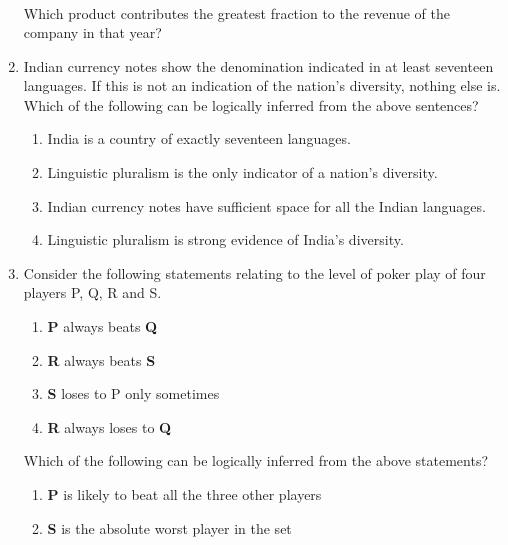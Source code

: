 \documentclass[journal,12pt,onecolumn]{IEEEtran}
\theoremstyle{remark}
\begin{document}
\begin{enumerate}
\begin{table}[h]
\begin{tabular}{|l|c|c|c|c|}
				\hline
			\end{tabular}
			\caption*{}
			\label{tab:razorsales}
		\end{table}
		
		Which product contributes the greatest fraction to the revenue of the company in that year?
		
		\hfill{}
		\begin{enumerate}
		\end{enumerate}
		
		\item Indian currency notes show the denomination indicated in at least seventeen languages. If this is not an indication of the nation's diversity, nothing else is.
		Which of the following can be logically inferred from the above sentences?
		
		\hfill{\brak{\text{GATE CS 2016}}}
		\begin{enumerate}
			\item India is a country of exactly seventeen languages.
			\item Linguistic pluralism is the only indicator of a nation's diversity.
			\item Indian currency notes have sufficient space for all the Indian languages.
			\item Linguistic pluralism is strong evidence of India's diversity.
		\end{enumerate}
		
		\item Consider the following statements relating to the level of poker play of four players P, Q, R and S.
		\begin{enumerate}
			\item \textbf{P} always beats \textbf{Q}
			\item \textbf{R} always beats \textbf{S}
			\item \textbf{S} loses to P only sometimes
			\item \textbf{R} always loses to \textbf{Q}
		\end{enumerate}
		Which of the following can be logically inferred from the above statements?
		\begin{enumerate}
			\item \textbf{P} is likely to beat all the three other players
			\item \textbf{S} is the absolute worst player in the set
		\end{enumerate}
		

\end{enumerate}
\end{document}
